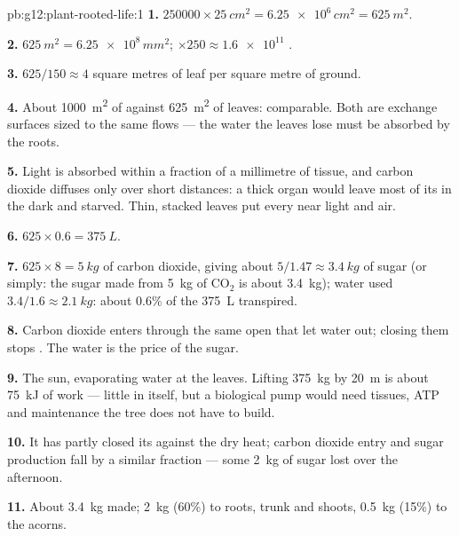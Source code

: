 \begin{solution}{pb:g12:plant-rooted-life:1}
\textbf{1.} $\num{250000} \times \qty{25}{cm^2} = \num{6.25e6}\,
\unit{cm^2} = \qty{625}{m^2}$.

\textbf{2.} $\qty{625}{m^2} = \num{6.25e8}\,\unit{mm^2}$; $\times 250
\approx \num{1.6e11}$ .

\textbf{3.} $625/150 \approx 4$ square metres of leaf per square metre
of ground.

\textbf{4.} About \qty{1000}{m^2} of  against \qty{625}{m^2}
of leaves: comparable. Both are exchange surfaces sized to the same
flows --- the water the leaves lose must be absorbed by the roots.

\textbf{5.} Light is absorbed within a fraction of a millimetre of
tissue, and carbon dioxide diffuses only over short distances: a
thick organ would leave most of its  in the dark and starved.
Thin, stacked leaves put every  near light and air.

\textbf{6.} $625 \times 0.6 = \qty{375}{L}$.

\textbf{7.} $625 \times 8 = \qty{5}{kg}$ of carbon dioxide, giving
about $5/1.47 \approx \qty{3.4}{kg}$ of sugar (or simply: the sugar
made from \qty{5}{kg} of $\mathrm{CO_2}$ is about \qty{3.4}{kg});
water used $3.4/1.6 \approx \qty{2.1}{kg}$: about 0.6\% of the
\qty{375}{L} transpired.

\textbf{8.} Carbon dioxide enters through the same open  that
let water out; closing them stops . The water is the
price of the sugar.

\textbf{9.} The sun, evaporating water at the leaves. Lifting
\qty{375}{kg} by \qty{20}{m} is about \qty{75}{kJ} of work --- little
in itself, but a biological pump would need tissues, ATP and
maintenance the tree does not have to build.

\textbf{10.} It has partly closed its  against the dry heat;
carbon dioxide entry and sugar production fall by a similar fraction
--- some \qty{2}{kg} of sugar lost over the afternoon.

\textbf{11.} About \qty{3.4}{kg} made; \qty{2}{kg} (60\%) to roots,
trunk and shoots, \qty{0.5}{kg} (15\%) to the acorns.


\end{solution}
